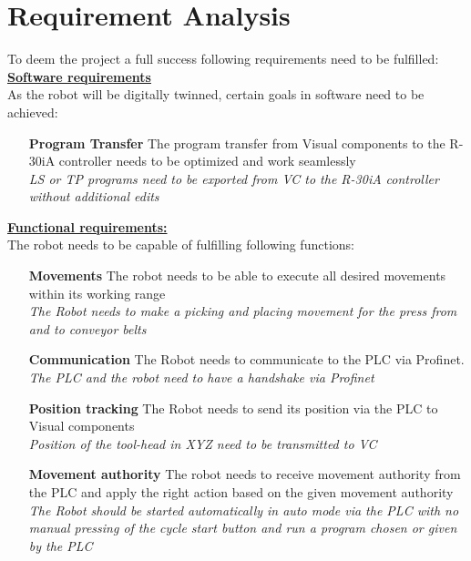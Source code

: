 
\chapter{Requirement Analysis}

To deem the project a full success following requirements need to be fulfilled:
\\
\underline{\textbf{Software requirements}}\vspace{2mm}\\
As the robot will be digitally twinned, certain goals in software need to be achieved:\\
\begin{itemize}[leftmargin=5cm]
	\item[\textbf{Program Transfer}] The program transfer from Visual components to the R-30iA controller needs to be optimized and work seamlessly\\
	\textit{LS or TP programs need to be exported from VC to the R-30iA controller without additional edits}
\end{itemize}
%
\underline{\textbf{Functional requirements:}}\vspace{2mm}\\
The robot needs to be capable of fulfilling following functions:\\
\begin{itemize}[leftmargin=5cm]
	\item[\textbf{Movements}] The robot needs to be able to execute all desired movements within its working range\\
	\textit{The Robot needs to make a picking and placing movement for the press from and to conveyor belts}
	\item[\textbf{Communication}] The Robot needs to communicate to the PLC via Profinet. \\
	\textit{The PLC and the robot need to have a handshake via Profinet}
	\item[\textbf{Position tracking}] The Robot needs to send its position via the PLC to Visual components\\
	\textit{Position of the tool-head in XYZ need to be transmitted to VC}
	\item[\textbf{Movement authority}] The robot needs to receive movement authority from the PLC and apply the right action based on the given movement authority\\
	\textit{The Robot should be started automatically in auto mode via the PLC with no manual pressing of the cycle start button and run a program chosen or given by the PLC}
\end{itemize}
